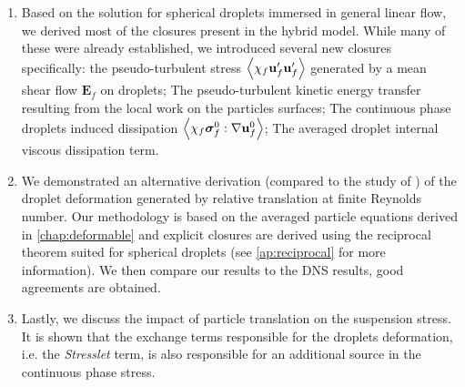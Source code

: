 \begin{enumerate}
    \item Based on the solution for spherical droplets immersed in general linear flow, we derived most of the closures present in the hybrid model. 
    While many of these were already established, we introduced several new closures specifically: 
    the pseudo-turbulent stress $\left<\chi_f \textbf{u}_f'\textbf{u}_f'\right>$ generated by a mean shear flow $\textbf{E}_f$ on droplets; 
    The pseudo-turbulent kinetic energy transfer resulting from the local work on the particles surfaces; 
    The continuous phase droplets induced dissipation $\left<\chi_f \bm\sigma_f^0:\mathbf{\nabla} \textbf{u}_f^0\right>$; 
    The averaged droplet internal viscous dissipation term. 
    \item %
    We demonstrated an alternative derivation (compared to the study of \citet{taylor1964deformation}) of the droplet deformation generated by relative translation at finite Reynolds number. 
    Our methodology is based on the averaged particle equations derived in \ref{chap:deformable} and explicit closures are derived using the reciprocal theorem suited for spherical droplets (see \ref{ap:reciprocal} for more information). 
    We then compare our results to the DNS results, good agreements are obtained. 
    \item 
    Lastly, we discuss the impact of particle translation on the suspension stress. 
    It is shown that the exchange terms responsible for the droplets deformation, i.e. the \textit{Stresslet} term, is also responsible for an additional source in the continuous phase stress. 

\end{enumerate}
